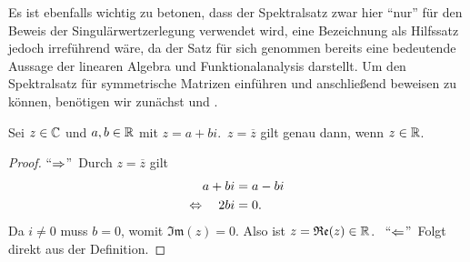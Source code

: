 Es ist ebenfalls wichtig zu betonen, dass der Spektralsatz zwar hier \enquote{nur} für den Beweis der Singulärwertzerlegung verwendet wird, eine Bezeichnung als Hilfssatz jedoch irreführend wäre, da der Satz für sich genommen bereits eine bedeutende Aussage der linearen Algebra und Funktionalanalysis darstellt.
Um den Spektralsatz für symmetrische Matrizen einführen und anschließend beweisen zu können, benötigen wir zunächst  und .
\begin{lemma}\label{complex}
    Sei \(z \in \mathbb{C}\) und \(a,b \in \mathbb{R}\) mit \(z = a + bi\).\ \(z = \overline{z}\) gilt genau dann, wenn \(z \in \mathbb{R}\).     
\end{lemma}
\begin{proof}
    \enquote{\(\Rightarrow\)}\ Durch \(z = \overline{z}\) gilt
    \begin{align*}
        a + bi &= a -bi\\
        \Leftrightarrow \quad 2bi &= 0.
    \end{align*}
    Da \(i \neq 0\) muss \(b = 0\), womit \(\mathfrak{Im}(z) = 0\). Also ist \(z = \mathfrak{Re}(z) \in \mathbb{R}\).\ \newline
    \enquote{\(\Leftarrow\)}\ Folgt direkt aus der Definition.  
\end{proof}

